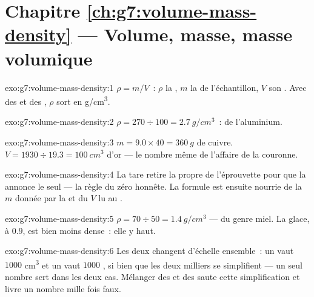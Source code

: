 \section*{Chapitre \ref{ch:g7:volume-mass-density} --- Volume, masse, masse volumique}

\begin{solution}{exo:g7:volume-mass-density:1}
$\rho = m/V$~: $\rho$ la , $m$ la  de
l'échantillon, $V$ son . Avec des  et des , $\rho$ sort en \unit{g/cm^3}.
\end{solution}

\begin{solution}{exo:g7:volume-mass-density:2}
$\rho = 270 \div 100 = \qty{2.7}{g/cm^3}$~: de l'aluminium.
\end{solution}

\begin{solution}{exo:g7:volume-mass-density:3}
$m = 9.0 \times 40 = \qty{360}{g}$ de cuivre.
$V = 1930 \div 19.3 = \qty{100}{cm^3}$ d'or --- le nombre même de
l'affaire de la couronne.
\end{solution}

\begin{solution}{exo:g7:volume-mass-density:4}
La tare retire la  propre de l'éprouvette pour que la 
annonce le  seul --- la règle du zéro honnête. La formule est
ensuite nourrie de la  $m$ donnée par la  et du 
$V$ lu au .
\end{solution}

\begin{solution}{exo:g7:volume-mass-density:5}
$\rho = 70 \div 50 = \qty{1.4}{g/cm^3}$ --- du genre miel. La glace,
à $0.9$, est bien moins dense~: elle y  haut.
\end{solution}

\begin{solution}{exo:g7:volume-mass-density:6}
Les deux  changent d'échelle ensemble~: un  vaut $1000$
\unit{cm^3} et un  vaut $1000$ , si bien que les
deux milliers se simplifient --- un seul nombre sert dans les deux
cas. Mélanger des  et des  saute cette simplification et
livre un nombre mille fois faux.
\end{solution}

